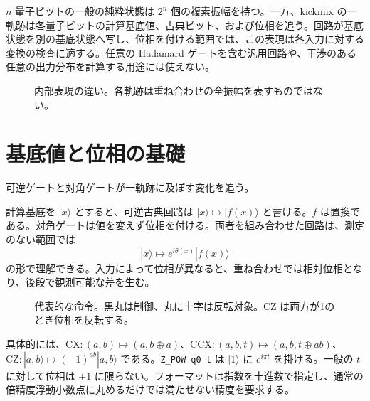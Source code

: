 \documentclass[a4paper,11pt,oneside,openany]{ltjsbook}
\newcommand{\code}[1]{\nolinkurl{#1}}
\begin{document}
$ n $ 量子ビットの一般の純粋状態は $2^n$ 個の複素振幅を持つ。一方、kickmix の一軌跡は各量子ビットの計算基底値、古典ビット、および位相を追う。回路が基底状態を別の基底状態へ写し、位相を付ける範囲では、この表現は各入力に対する変換の検査に適する。任意の Hadamard ゲートを含む汎用回路や、干渉のある任意の出力分布を計算する用途には使えない。
\begin{figure}[htbp]\centering
{}\caption{内部表現の違い。各軌跡は重ね合わせの全振幅を表すものではない。}\end{figure}

\chapter{基底値と位相の基礎}
\begin{goal}可逆ゲートと対角ゲートが一軌跡に及ぼす変化を追う。\end{goal}
計算基底を $|x\rangle$ とすると、可逆古典回路は $|x\rangle\mapsto|f(x)\rangle$ と書ける。$f$ は置換である。対角ゲートは値を変えず位相を付ける。両者を組み合わせた回路は、測定のない範囲では
\begin{equation}|x\rangle\longmapsto e^{i\theta(x)}|f(x)\rangle\end{equation}
の形で理解できる。入力によって位相が異なると、重ね合わせでは相対位相となり、後段で観測可能な差を生む。
\begin{figure}[htbp]\centering
{}\caption{代表的な命令。黒丸は制御、丸に十字は反転対象。CZ は両方が1のとき位相を反転する。}\end{figure}
具体的には、$\mathrm{CX}: (a,b)\mapsto(a,b\oplus a)$、$\mathrm{CCX}: (a,b,t)\mapsto(a,b,t\oplus ab)$、$\mathrm{CZ}:|a,b\rangle\mapsto(-1)^{ab}|a,b\rangle$ である。\code{Z_POW q0 t} は $|1\rangle$ に $e^{i\pi t}$ を掛ける。一般の $t$ に対して位相は $\pm1$ に限らない。フォーマットは指数を十進数で指定し、通常の倍精度浮動小数点に丸めるだけでは満たせない精度を要求する。
\end{document}
